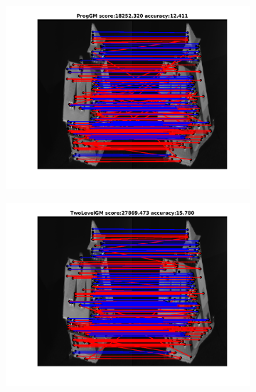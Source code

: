\begin{figure}[h] 		
	\begin{subfigure}[b]{0.3\textwidth}
		\centering
		\includegraphics[scale=0.25]{"chapter3/fig/HouseSeq/anchor_descr/using_cpd_afftrafo//solution/fi_1_ProgGM"}  
	\end{subfigure}%
	\begin{subfigure}[b]{0.3\textwidth}
		\centering
		\includegraphics[scale=0.25]{"chapter3/fig/HouseSeq/anchor_descr/using_cpd_afftrafo/solution/fi_1_TwoLevelGM"}  
	\end{subfigure} 
	\begin{subfigure}[b]{0.3\textwidth}
		\centering

\end{subfigure}
\end{figure}
